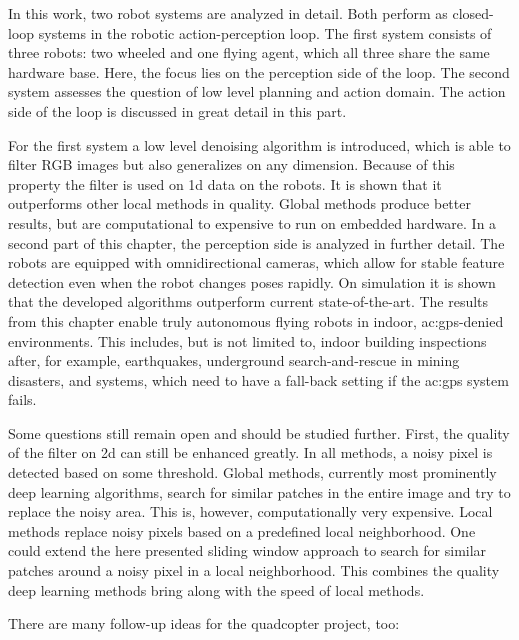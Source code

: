 \label{sec:conclusion_conclusion}

In this work, two robot systems are analyzed in detail.
Both perform as closed-loop systems in the robotic action-perception loop.
The first system consists of three robots: two wheeled and one flying agent, which all three share the same hardware base.
Here, the focus lies on the perception side of the loop.
The second system assesses the question of low level planning and action domain.
The action side of the loop is discussed in great detail in this part.


For the first system a low level denoising algorithm is introduced, which is able to filter RGB images but also generalizes on any dimension.
Because of this property the filter is used on 1d data on the robots.
It is shown that it outperforms other local methods in quality.
Global methods produce better results, but are computational to expensive to run on embedded hardware.
In a second part of this chapter, the perception side is analyzed in further detail.
The robots are equipped with omnidirectional cameras, which allow for stable feature detection even when the robot changes poses rapidly.
On simulation it is shown that the developed algorithms outperform current state-of-the-art.
The results from this chapter enable truly autonomous flying robots in indoor, \gls{ac:gps}-denied environments.
This includes, but is not limited to, indoor building inspections after, for example, earthquakes, underground search-and-rescue in mining disasters, and systems, which need to have a fall-back setting if the \gls{ac:gps} system fails.


Some questions still remain open and should be studied further.
First, the quality of the filter on 2d can still be enhanced greatly.
In all methods, a noisy pixel is detected based on some threshold.
Global methods, currently most prominently deep learning algorithms, search for similar patches in the entire image and try to replace the noisy area.
This is, however, computationally very expensive.
Local methods replace noisy pixels based on a predefined local neighborhood.
One could extend the here presented sliding window approach to search for similar patches around a noisy pixel in a local neighborhood.
This combines the quality deep learning methods bring along with the speed of local methods.

There are many follow-up ideas for the quadcopter project, too:

